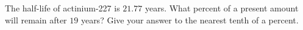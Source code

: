 The half-life of actinium-227 is $21.77$ years. What percent of a present amount will remain after $19$ years? Give your answer to the nearest tenth of a percent.

